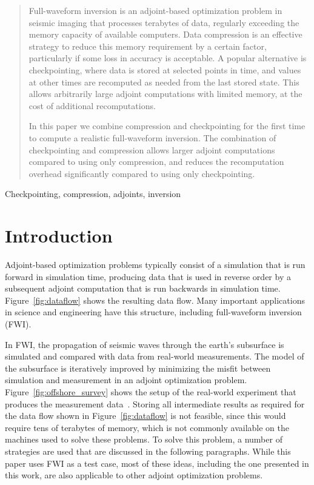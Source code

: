 \documentclass[conference]{IEEEtran}
\begin{document}
\begin{abstract}
Full-waveform inversion is an adjoint-based optimization problem in seismic
imaging that processes terabytes of data, regularly exceeding the memory
capacity of available computers. Data compression is an effective strategy to
reduce this memory requirement by a certain factor, particularly if some loss in
accuracy is acceptable. A popular alternative is checkpointing, where data is
stored at selected points in time, and values at other times are recomputed as
needed from the last stored state.  This allows arbitrarily large adjoint
computations with limited memory, at the cost of additional recomputations.

In this paper we combine compression and checkpointing for the first
time to compute a realistic full-waveform inversion. The combination of
checkpointing and compression allows
larger adjoint computations compared to using only compression, and
reduces the recomputation overhead significantly compared to using only checkpointing.
\end{abstract}

\begin{IEEEkeywords}
Checkpointing, compression, adjoints, inversion
\end{IEEEkeywords}

\section{Introduction}
Adjoint-based optimization problems typically consist of a simulation that is
run forward in simulation time, producing data that is used in reverse order by
a subsequent adjoint computation that is run backwards in simulation time.
Figure~\ref{fig:dataflow} shows the resulting data flow. Many important
applications in science and engineering have this structure, including
full-waveform inversion (FWI).

In FWI, the propagation of seismic waves through the earth's subsurface is
simulated and compared with data from real-world measurements. The model of the
subsurface is iteratively improved by minimizing the misfit between simulation and
measurement in an adjoint optimization problem.
Figure~\ref{fig:offshore_survey} shows the setup of the real-world experiment that
produces the measurement data~\cite{plessix2006review}. Storing all intermediate
results as required for the data flow shown in Figure~\ref{fig:dataflow} is not
feasible, since this would require tens of terabytes of memory, which is not
commonly available on the machines used to solve these problems. To solve this
problem, a number of strategies are used that are discussed in the following
paragraphs. While this paper uses FWI as a test case, most of these ideas,
including the one presented in this work, are also applicable to other adjoint
optimization problems.
\end{document}
